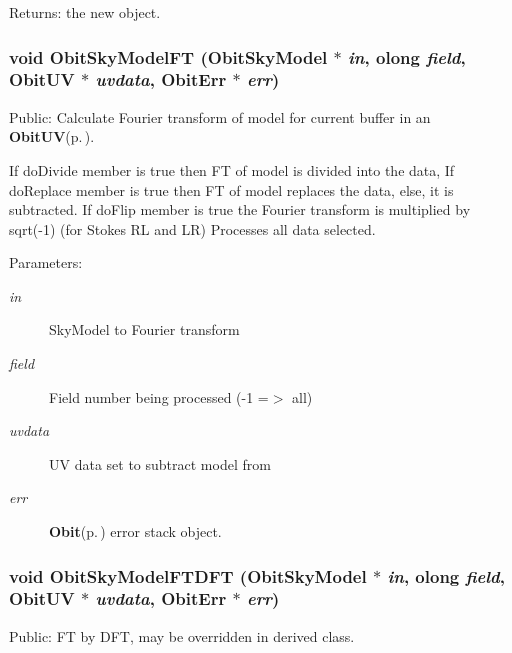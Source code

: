 \begin{Desc}
\item[Returns:]the new object. \end{Desc}
\subsubsection{\setlength{\rightskip}{0pt plus 5cm}void Obit\-Sky\-Model\-FT ({\bf Obit\-Sky\-Model} $\ast$ {\em in}, {\bf olong} {\em field}, {\bf Obit\-UV} $\ast$ {\em uvdata}, {\bf Obit\-Err} $\ast$ {\em err})}\label{ObitSkyModel_8h_a60}


Public: Calculate Fourier transform of model for current buffer in an {\bf Obit\-UV}{\rm (p.\,\pageref{structObitUV})}. 

If do\-Divide member is true then FT of model is divided into the data, If do\-Replace member is true then FT of model replaces the data, else, it is subtracted. If do\-Flip member is true the Fourier transform is multiplied by sqrt(-1) (for Stokes RL and LR) Processes all data selected. \begin{Desc}
\item[Parameters:]
\begin{description}
\item[{\em in}]Sky\-Model to Fourier transform \item[{\em field}]Field number being processed (-1 =$>$ all) \item[{\em uvdata}]UV data set to subtract model from \item[{\em err}]{\bf Obit}{\rm (p.\,\pageref{structObit})} error stack object. \end{description}
\end{Desc}
\subsubsection{\setlength{\rightskip}{0pt plus 5cm}void Obit\-Sky\-Model\-FTDFT ({\bf Obit\-Sky\-Model} $\ast$ {\em in}, {\bf olong} {\em field}, {\bf Obit\-UV} $\ast$ {\em uvdata}, {\bf Obit\-Err} $\ast$ {\em err})}\label{ObitSkyModel_8h_a65}


Public: FT by DFT, may be overridden in derived class. 

